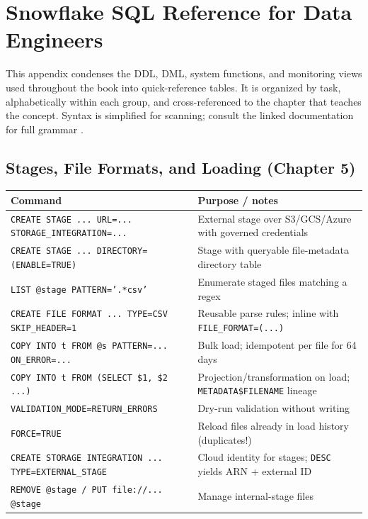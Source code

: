 \chapter{Snowflake SQL Reference for Data Engineers}
%
This appendix condenses the DDL, DML, system functions, and monitoring views used throughout the book into quick-reference tables. It is organized by task, alphabetically within each group, and cross-referenced to the chapter that teaches the concept. Syntax is simplified for scanning; consult the linked documentation for full grammar \cite{snowflakeDataLoadDocs,snowflakeTasksDocs,snowflakeStreamsDocs}.

\section{Stages, File Formats, and Loading (Chapter 5)}
\begin{center}
\footnotesize
\begin{tabular}{@{}p{5.6cm}p{8.6cm}@{}}
\toprule
\textbf{Command} & \textbf{Purpose / notes} \\
\midrule
\texttt{CREATE STAGE ... URL=... STORAGE\_INTEGRATION=...} & External stage over S3/GCS/Azure with governed credentials \\
\texttt{CREATE STAGE ... DIRECTORY=(ENABLE=TRUE)} & Stage with queryable file-metadata directory table \\
\texttt{LIST @stage PATTERN='.*csv'} & Enumerate staged files matching a regex \\
\texttt{CREATE FILE FORMAT ... TYPE=CSV SKIP\_HEADER=1} & Reusable parse rules; inline with \texttt{FILE\_FORMAT=(...)} \\
\texttt{COPY INTO t FROM @s PATTERN=... ON\_ERROR=...} & Bulk load; idempotent per file for 64 days \\
\texttt{COPY INTO t FROM (SELECT \$1, \$2 ...)} & Projection/transformation on load; \texttt{METADATA\$FILENAME} lineage \\
\texttt{VALIDATION\_MODE=RETURN\_ERRORS} & Dry-run validation without writing \\
\texttt{FORCE=TRUE} & Reload files already in load history (duplicates!) \\
\texttt{CREATE STORAGE INTEGRATION ... TYPE=EXTERNAL\_STAGE} & Cloud identity for stages; \texttt{DESC} yields ARN + external ID \\
\texttt{REMOVE @stage / PUT file://... @stage} & Manage internal-stage files \\
\bottomrule
\end{tabular}
\end{center}

